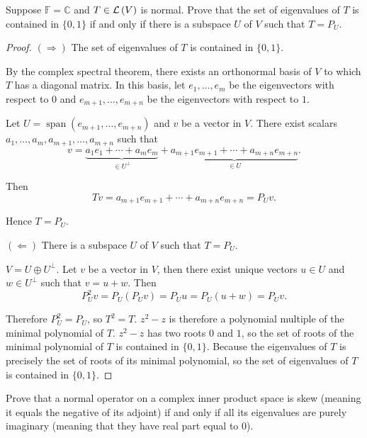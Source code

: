 \begin{exercise}
    Suppose $\mathbb{F} = \mathbb{C}$ and $T\in\mathcal{L}\left({V}\right)$ is normal. Prove that the set of eigenvalues of $T$ is contained in $\{0, 1\}$ if and only if there is a subspace $U$ of $V$ such that $T = P_{U}$.
\end{exercise}

\begin{proof}
    $(\Rightarrow)$ The set of eigenvalues of $T$ is contained in $\{0, 1\}$.

    By the complex spectral theorem, there exists an orthonormal basis of $V$ to which $T$ has a diagonal matrix. In this basis, let $e_{1}, \ldots, e_{m}$ be the eigenvectors with respect to $0$ and $e_{m+1}, \ldots, e_{m+n}$ be the eigenvectors with respect to $1$.

    Let $U = \operatorname{span}(e_{m+1}, \ldots, e_{m+n})$ and $v$ be a vector in $V$. There exist scalars $a_{1}, \ldots, a_{m}, a_{m+1}, \ldots, a_{m+n}$ such that
    \[
        v = \underbrace{a_{1}e_{1} + \cdots + a_{m}e_{m}}_{\in U^{\bot}} + \underbrace{a_{m+1}e_{m+1} + \cdots + a_{m+n}e_{m+n}}_{\in U}.
    \]

    Then
    \[
        Tv = a_{m+1}e_{m+1} + \cdots + a_{m+n}e_{m+n} = P_{U}v.
    \]

    Hence $T = P_{U}$.

    $(\Leftarrow)$ There is a subspace $U$ of $V$ such that $T = P_{U}$.

    $V = U\oplus U^{\bot}$. Let $v$ be a vector in $V$, then there exist unique vectors $u\in U$ and $w\in U^{\bot}$ such that $v = u + w$. Then
    \[
        P_{U}^{2}v = P_{U}(P_{U}v) = P_{U}u = P_{U}(u + w) = P_{U}v.
    \]

    Therefore $P_{U}^{2} = P_{U}$, so $T^{2} = T$. $z^{2} - z$ is therefore a polynomial multiple of the minimal polynomial of $T$. $z^{2} - z$ has two roots $0$ and $1$, so the set of roots of the minimal polynomial of $T$ is contained in $\{ 0, 1 \}$. Because the eigenvalues of $T$ is precisely the set of roots of its minimal polynomial, so the set of eigenvalues of $T$ is contained in $\{ 0, 1 \}$.
\end{proof}
\newpage

\begin{exercise}
    Prove that a normal operator on a complex inner product space is skew (meaning it equals the negative of its adjoint) if and only if all its eigenvalues are purely imaginary (meaning that they have real part equal to $0$).
\end{exercise}

